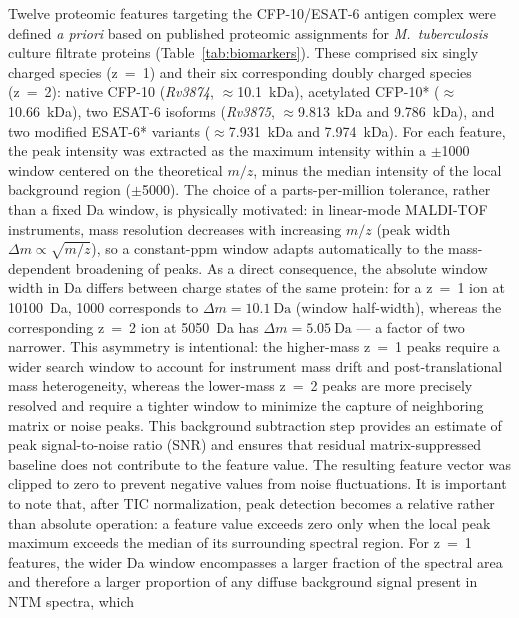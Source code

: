 \documentclass[journal=ancham, manuscript=article, layout=traditional]{achemso}
\begin{document}
Twelve proteomic features targeting the CFP-10/ESAT-6 antigen
complex were defined \textit{a priori} based on published proteomic
assignments for \textit{M.~tuberculosis} culture filtrate
proteins\cite{Berthet1998, Lotz2010} (Table~\ref{tab:biomarkers}).
These comprised six singly charged species (z~=~1) and their six
corresponding doubly charged species (z~=~2):
native CFP-10 (\textit{Rv3874}, $\approx$\SI{10.1}{\kilo\dalton}),
acetylated CFP-10* ($\approx$\SI{10.66}{\kilo\dalton}),
two ESAT-6 isoforms (\textit{Rv3875},
$\approx$\SI{9.813}{\kilo\dalton} and \SI{9.786}{\kilo\dalton}),
and two modified ESAT-6* variants
($\approx$\SI{7.931}{\kilo\dalton} and \SI{7.974}{\kilo\dalton}).
For each feature, the peak intensity was extracted as the maximum
intensity within a $\pm$\SI{1000}{\ppm} window centered on the
theoretical $m/z$, minus the median intensity of the local background
region ($\pm$\SI{5000}{\ppm}).
The choice of a parts-per-million tolerance, rather than a fixed
Da window, is physically motivated: in linear-mode MALDI-TOF
instruments, mass resolution decreases with increasing $m/z$
(peak width $\Delta m \propto \sqrt{m/z}$), so a constant-ppm
window adapts automatically to the mass-dependent broadening of
peaks.\cite{Gross2004MS}
As a direct consequence, the absolute window width in Da differs
between charge states of the same protein: for a z~=~1 ion at
\SI{10100}{\dalton}, \SI{1000}{\ppm} corresponds to
$\Delta m = \SI{10.1}{\dalton}$ (window half-width), whereas the
corresponding z~=~2 ion at \SI{5050}{\dalton} has
$\Delta m = \SI{5.05}{\dalton}$ --- a factor of two narrower.
This asymmetry is intentional: the higher-mass z~=~1 peaks require
a wider search window to account for instrument mass drift and
post-translational mass heterogeneity, whereas the lower-mass
z~=~2 peaks are more precisely resolved and require a tighter
window to minimize the capture of neighboring matrix or noise peaks.
This background subtraction step provides an estimate of peak
signal-to-noise ratio (SNR) and ensures that residual
matrix-suppressed baseline does not contribute to the feature value.
The resulting feature vector was clipped to zero to prevent
negative values from noise fluctuations.
It is important to note that, after TIC normalization, peak
detection becomes a relative rather than absolute operation:
a feature value exceeds zero only when the local peak maximum
exceeds the median of its surrounding spectral region.
For z~=~1 features, the wider Da window encompasses a larger
fraction of the spectral area and therefore a larger proportion
of any diffuse background signal present in NTM spectra, which
\end{document}
